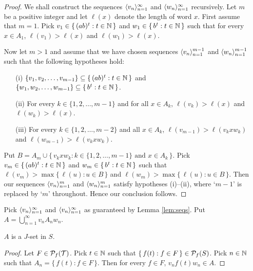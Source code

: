 \begin{proof}
  We shall construct the sequences $\langle v_n \rangle_{n=1}^\infty$ and $\langle w_n \rangle_{n=1}^\infty$ recursively. 
  Let $m$ be a positive integer and let $\ell(x)$ denote the length of word $x$.
  First assume that $m = 1$. 
  Pick $v_1 \in \{\, (ab)^t : t \in \mathbb{N} \,\}$ and $w_1 \in \{\, b^t : t \in \mathbb{N} \,\}$ such that for every $x \in A_1$, $\ell(v_1) > \ell(x)$ and $\ell(w_1) > \ell(x)$. 

  Now let $m > 1$ and assume that we have chosen sequences $\langle v_n \rangle_{n=1}^{m-1}$ and $\langle w_n \rangle_{n=1}^{m-1}$ such that the following hypotheses hold:
  \begin{itemize}
    \item[(i)]
      $\{v_1, v_2, \ldots, v_{m-1}\} \subseteq \{\, (ab)^t : t \in \mathbb{N} \,\}$ and $\{w_1, w_2, \ldots, w_{m-1}\} \subseteq \{\, b^t : t \in \mathbb{N} \,\}$.

    \item[(ii)]
      For every $k \in \{1, 2, \ldots, m-1\}$ and for all $x \in A_k$, $\ell(v_k) > \ell(x)$ and $\ell(w_k) > \ell(x)$. 

    \item[(iii)]
      For every $k \in \{1, 2, \ldots, m-2\}$ and all $x \in A_k$, $\ell(v_{m-1}) > \ell(v_kxw_k)$ and $\ell(w_{m-1}) > \ell(v_kxw_k)$.
  \end{itemize}
  Put $B = A_m \cup \{\, v_kxw_k : \mbox{$k \in \{1, 2, \ldots, m-1\}$ and $x \in A_k$} \,\}$.
  Pick $v_m \in \{\, (ab)^t : t \in \mathbb{N} \,\}$ and $w_m \in \{\, b^t : t \in \mathbb{N} \,\}$ such that $\ell(v_m) > \max\{\, \ell(u) : u \in B \,\}$ and $\ell(w_m) > \max\{\, \ell(u) : u \in B \,\}$. 
  Then our sequences $\langle v_n \rangle_{n=1}^{m}$ and $\langle w_n \rangle_{n=1}^{m}$ satisfy hypotheses (i)--(ii), where `$m-1$' is replaced by `$m$' throughout.
  Hence our conclusion follows.
\end{proof}

\begin{defn}
  Pick $\langle v_n \rangle_{n=1}^\infty$ and $\langle v_n \rangle_{n=1}^\infty$ as guaranteed by Lemma \ref{lem:seqs}.
  Put $A = \bigcup_{n=1}^\infty v_nA_nw_n$.
\end{defn}

\begin{lem}
  $A$ is a $J$-set in $S$. 
\end{lem}
\begin{proof}
  Let $F \in \mathcal{P}_f(\mathcal{T})$.
  Pick $t \in \mathbb{N}$ such that $\{\, f(t) : f \in F\,\} \in \mathcal{P}_f(S)$.
  Pick $n \in \mathbb{N}$ such that $A_n = \{\, f(t) : f \in F\,\}$. 
  Then for every $f \in F$, $v_nf(t)w_n \in A$. 
\end{proof}

